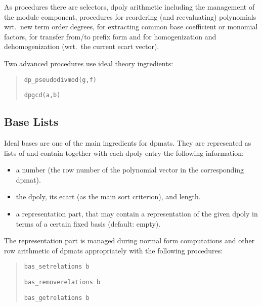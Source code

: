 As procedures there are selectors, dpoly arithmetic including the management
of the module component, procedures for reordering (and reevaluating)
polynomials wrt.\ new term order degrees, for extracting common base
coefficient or monomial factors, for transfer from/to prefix form and for
homogenization and dehomogenization (wrt.\ the current ecart vector).

Two advanced procedures use ideal theory ingredients:
\begin{quote}
\verb|dp_pseudodivmod(g,f)|


\verb|dpgcd(a,b)| 

\end{quote}


\subsection{Base Lists}

Ideal bases are one of the main ingredients for dpmats. They are
represented as lists of  and contain together with
each dpoly entry the following information:
\begin{itemize}
\item a number (the row number of the polynomial vector in the
corresponding dpmat).

\item the dpoly, its ecart (as the main sort criterion), and length. 

\item a representation part, that may contain a representation of the
given dpoly in terms of a certain fixed basis (default: empty).
\end{itemize}

The representation part is managed during normal form computations
and other row arithmetic of dpmats appropriately with the following
procedures: 
\begin{quote}
\verb|bas_setrelations b| 


\verb|bas_removerelations b| 


\verb|bas_getrelations b| 

\end{quote}

